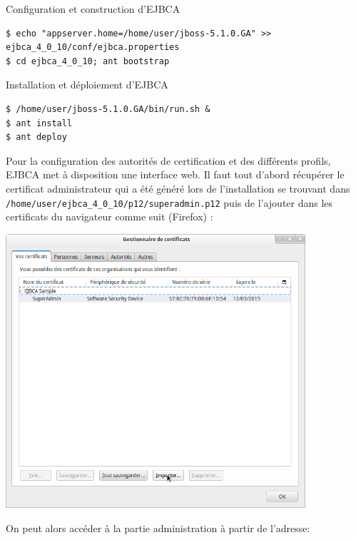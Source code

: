 \documentclass[a4paper,11pt,french]{book}
\begin{document}
\begin{paragraph}{Configuration et construction d'EJBCA}
\small{
\begin{verbatim}
$ echo "appserver.home=/home/user/jboss-5.1.0.GA" >> ejbca_4_0_10/conf/ejbca.properties
$ cd ejbca_4_0_10; ant bootstrap 
\end{verbatim}
}
\end{paragraph}

\begin{paragraph}{Installation et déploiement d'EJBCA}
\small{
\begin{verbatim}
$ /home/user/jboss-5.1.0.GA/bin/run.sh &
$ ant install
$ ant deploy
\end{verbatim}
}
\end{paragraph}
\newpage

Pour la configuration des autorités de certification et des différents profils, EJBCA met à disposition une interface web. Il faut tout d'abord récupérer le certificat administrateur qui a été généré lors de l'installation se trouvant dans \verb+/home/user/ejbca_4_0_10/p12/superadmin.p12+ puis de l'ajouter dans les certificats du navigateur comme suit (Firefox) :

\begin{center}
\includegraphics[width=30em]{import_superadmin.png}
\end{center}

On peut alors accéder à la partie administration à partir de l'adresse:
\end{document}
